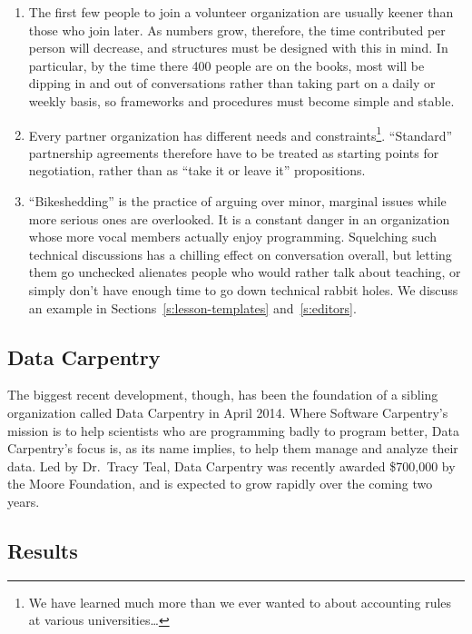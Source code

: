 \documentclass[10pt,a4paper,twocolumn]{article}
\begin{document}
\begin{enumerate}

\item
  The first few people to join a volunteer organization are usually
  keener than those who join later.  As numbers grow, therefore, the
  time contributed per person will decrease, and structures must be
  designed with this in mind.  In particular, by the time there 400
  people are on the books, most will be dipping in and out of
  conversations rather than taking part on a daily or weekly basis, so
  frameworks and procedures must become simple and stable.

\item
  Every partner organization has different needs and
  constraints\footnote{We have learned much more than we ever wanted
    to about accounting rules at various universities\ldots}.
  ``Standard'' partnership agreements therefore have to
  be treated as starting points for negotiation, rather than as ``take
  it or leave it'' propositions.

\item
  ``Bikeshedding'' is the practice of arguing over minor, marginal
  issues while more serious ones are overlooked.  It is a constant
  danger in an organization whose more vocal members actually enjoy
  programming.  Squelching such technical discussions has a chilling
  effect on conversation overall, but letting them go unchecked
  alienates people who would rather talk about teaching, or simply
  don't have enough time to go down technical rabbit holes.  We
  discuss an example in Sections~\ref{s:lesson-templates}
  and~\ref{s:editors}.

\end{enumerate}

\subsection{Data Carpentry}

The biggest recent development, though, has been the foundation of a
sibling organization called Data Carpentry in April 2014.  Where
Software Carpentry's mission is to help scientists who are programming
badly to program better, Data Carpentry's focus is, as its name
implies, to help them manage and analyze their data.  Led by
Dr.\ Tracy Teal, Data Carpentry was recently awarded \$700,000 by the
Moore Foundation, and is expected to grow rapidly over the coming two
years.

\subsection{Results}
\end{document}
